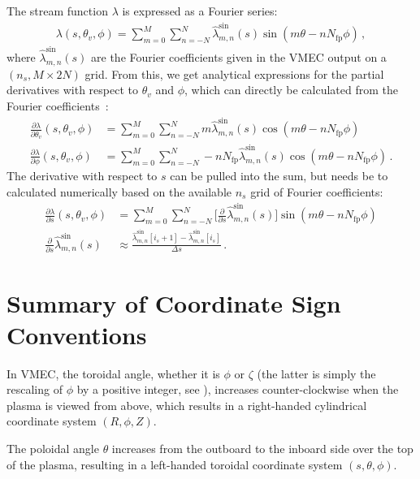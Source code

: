 The stream function $\lambda$ is expressed as a Fourier series:
\begin{align}
 \lambda(s, \theta_v, \phi) = \sum_{m=0}^M\sum_{n=-N}^{N}\hat{\lambda}_{m,n}^{\sin}(s)\sin{(m\theta - nN_\mathrm{fp}\phi)} \, ,
\end{align}
where $\hat{\lambda}_{m,n}^{\sin}(s)$ are the Fourier coefficients given in the VMEC output on a $(n_s, M\times 2N)$ grid.
%
From this, we get analytical expressions for the partial derivatives with respect to $\theta_v$ and $\phi$,
which can directly be calculated from the Fourier coefficients~\cite{stella_doc}:
\begin{align}
 \frac{\partial\lambda}{\partial\theta_v}(s, \theta_v, \phi) &=
   \sum_{m=0}^M\sum_{n=-N}^{N}
     m\hat{\lambda}_{m,n}^{\sin}(s)\cos{(m\theta - nN_\mathrm{fp}\phi)} \\
 \frac{\partial\lambda}{\partial\phi}(s, \theta_v, \phi) &=
   \sum_{m=0}^M\sum_{n=-N}^{N}
     -nN_\mathrm{fp}\hat{\lambda}_{m,n}^{\sin}(s)\cos{(m\theta - nN_\mathrm{fp}\phi)} \, .
\end{align}
%
The derivative with respect to $s$ can be pulled into the sum,
but needs be to calculated numerically based on the available $n_s$ grid of Fourier coefficients:
\begin{align}
 \frac{\partial\lambda}{\partial s}(s, \theta_v, \phi) &=
   \sum_{m=0}^M\sum_{n=-N}^{N}
     \bigg[ \frac{\partial}{\partial s}\hat{\lambda}_{m,n}^{\sin}(s) \bigg] \sin{(m\theta - nN_\mathrm{fp}\phi)} \\
 \frac{\partial}{\partial s}\hat{\lambda}_{m,n}^{\sin}(s) &\approx
   \frac{\hat{\lambda}_{m,n}^{\sin}[i_s +1] - \hat{\lambda}_{m,n}^{\sin}[i_s]}{\Delta s} \, .
\end{align}

\FloatBarrier
\section{Summary of Coordinate Sign Conventions} \label{sec:sign_conventions}
%
In VMEC, the toroidal angle, whether it is $\phi$ or $\zeta$
(the latter is simply the rescaling of $\phi$ by a positive integer, see ),
increases counter-clockwise when the plasma is viewed from above,
which results in a right-handed cylindrical coordinate system $(R, \phi, Z)$.

The poloidal angle $\theta$ increases from the outboard to the inboard side over the top of the plasma,
resulting in a left-handed toroidal coordinate system $(s, \theta, \phi)$.

